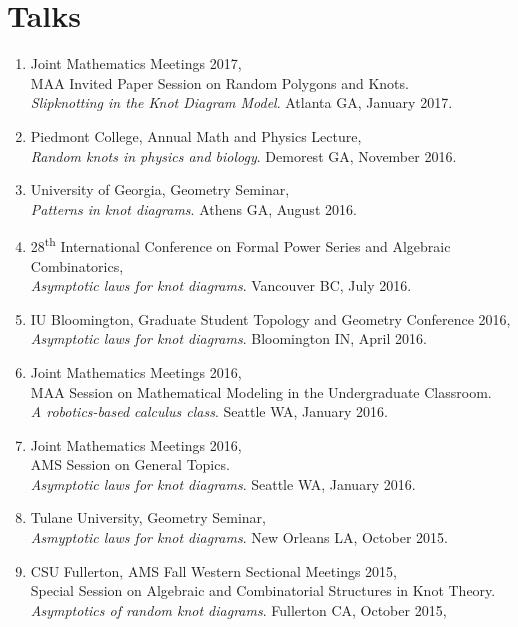 \documentclass[letterpaper]{article}
\begin{document}
\section*{Talks}

\begin{enumerate}
\item Joint Mathematics Meetings 2017, \\
  MAA Invited Paper Session on Random Polygons and Knots. \\
  \textit{Slipknotting in the Knot Diagram Model}. Atlanta GA, January 2017.

\item Piedmont College, Annual Math and Physics Lecture, \\
  \textit{Random knots in physics and biology}. Demorest GA, November 2016.

\item University of Georgia, Geometry Seminar, \\
  \textit{Patterns in knot diagrams}. Athens GA, August 2016. 

\item 28\textsuperscript{th} International Conference on Formal Power Series and
  Algebraic Combinatorics, \\
  \textit{Asymptotic laws for knot diagrams}. Vancouver BC, July 2016.

\item IU Bloomington, Graduate Student Topology and Geometry Conference 2016, \\
  \textit{Asymptotic laws for knot diagrams}. Bloomington IN, April 2016.
  
\item Joint Mathematics Meetings 2016, \\
  MAA Session on Mathematical Modeling in the Undergraduate Classroom. \\
  \textit{A robotics-based calculus class}. Seattle WA, January 2016.

\item Joint Mathematics Meetings 2016, \\
  AMS Session on General Topics. \\
  \textit{Asymptotic laws for knot diagrams}. Seattle WA, January 2016.

\item Tulane University, Geometry Seminar, \\
  \textit{Asmyptotic laws for knot diagrams}. New Orleans LA, October 2015.

\item CSU Fullerton, AMS Fall Western Sectional Meetings 2015,\\
  Special Session on Algebraic and Combinatorial Structures in Knot Theory. \\
  \textit{Asymptotics of random knot diagrams}. Fullerton CA, October 2015,


\end{enumerate}
\end{document}
